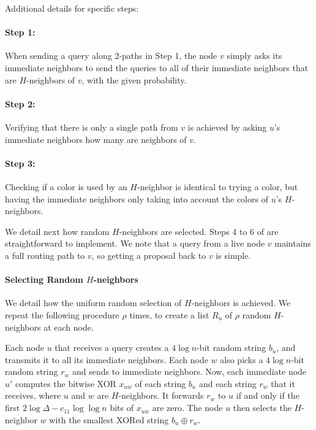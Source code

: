 Additional details for specific steps:
\paragraph{Step 1:}
When sending a query along 2-paths in Step 1, the node $v$ simply asks its immediate neighbors to send the queries to all of their immediate neighbors that are $H$-neighbors of $v$, with the given probability.
\paragraph{Step 2:}
Verifying that there is only a single path from $v$ is achieved by asking $u$'s immediate neighbors how many are neighbors of $v$. 

\paragraph{Step 3:}Checking if a color is used by an $H$-neighbor is identical to trying a color, but having the immediate neighbors only taking into account the colors of $u$'s $H$-neighbors.



We detail next how random $H$-neighbors are selected.
Steps 4 to 6 of  are straightforward to implement. We note that a query from a live node $v$ maintains a full routing path to $v$, so getting a proposal back to $v$ is simple.

\paragraph{Selecting Random $H$-neighbors}

We detail how the uniform random selection of $H$-neighbors is achieved.
We repeat the following procedure $\rho$ times, to create a list $R_u$ of $\rho$ random $H$-neighbors at each node.

Each node $u$ that receives a query creates a $4\log n$-bit random string $b_u$, and transmits it to all its immediate neighbors. Each node $w$ also picks a $4\log n$-bit random string $r_w$ and sends to immediate neighbors. Now, each immediate node $u'$ computes the bitwise XOR $x_{uw}$ of each string $b_u$ and each string $r_w$ that it receives, where $u$ and $w$ are $H$-neighbors. It forwards $r_w$ to $u$ if and only if the first $2\log \Delta - c_{11} \log\log n$ bits of $x_{uw}$ are zero. 
The node $u$ then selects the $H$-neighbor $w$ with the smallest XORed string $b_u \oplus r_w$. 



